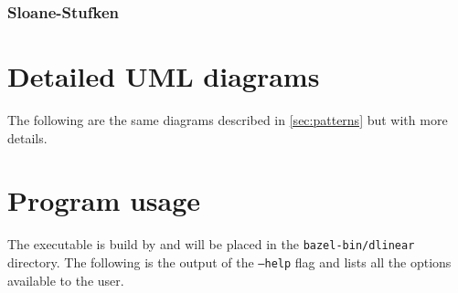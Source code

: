 \begin{appendices}
    \subsection*{Sloane-Stufken}


    \chapter{Detailed UML diagrams}

    The following are the same diagrams described in \autoref{sec:patterns} but with more details.



    \chapter{Program usage}

    The \dlinear executable is build by \bazel and will be placed in the \texttt{bazel-bin/dlinear} directory.
    The following is the output of the \texttt{--help} flag and lists all the options available to the user.

    

\end{appendices}
